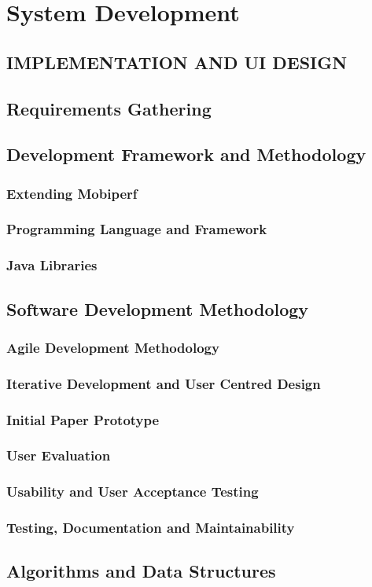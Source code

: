 \section{System Development}\label{sec:system-development}
\subsection*{IMPLEMENTATION AND UI DESIGN}
\subsection{Requirements Gathering}\label{subsec:requirements-gathering}
\subsection{Development Framework and Methodology}\label{subsec:development-framework-and-methodology}
\subsubsection{Extending Mobiperf}
\subsubsection{Programming Language and Framework}
\subsubsection{Java Libraries}
\subsection{Software Development Methodology}\label{subsec:software-development-methodology}
\subsubsection{Agile Development Methodology}
\subsubsection{Iterative Development and User Centred Design}
\subsubsection{Initial Paper Prototype}
\subsubsection{User Evaluation}
\subsubsection{Usability and User Acceptance Testing}
\subsubsection{Testing, Documentation and Maintainability}
\subsection{Algorithms and Data Structures}\label{subsec:algorithms-and-data-structures}
